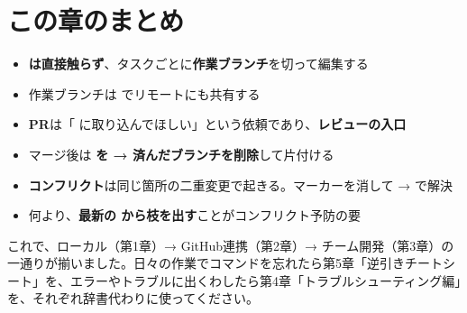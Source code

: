 \section*{この章のまとめ}

\begin{itemize}[leftmargin=1.4em]
  \item \textbf{ は直接触らず}、タスクごとに\textbf{作業ブランチ}を切って編集する
  \item 作業ブランチは  でリモートにも共有する
  \item \textbf{PR}は「 に取り込んでほしい」という依頼であり、\textbf{レビューの入口}
  \item マージ後は \textbf{ を  → 済んだブランチを削除}して片付ける
  \item \textbf{コンフリクト}は同じ箇所の二重変更で起きる。マーカーを消して  →  で解決
  \item 何より、\textbf{最新の  から枝を出す}ことがコンフリクト予防の要
\end{itemize}

これで、ローカル（第1章）→ GitHub連携（第2章）→ チーム開発（第3章）の一通りが揃いました。日々の作業でコマンドを忘れたら第5章「逆引きチートシート」を、エラーやトラブルに出くわしたら第4章「トラブルシューティング編」を、それぞれ辞書代わりに使ってください。

